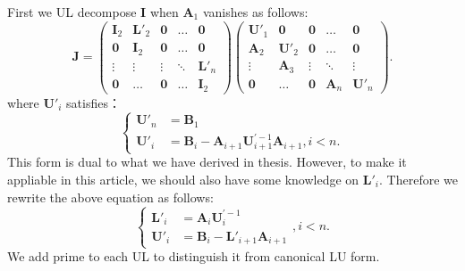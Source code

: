 \documentclass[12pt]{article}
\begin{document}
First we UL decompose $\bm{I}$ when $\bm{A}_1$ vanishes as follows:
\begin{equation}\label{eq:UL}
  \bm{J}=\begin{pmatrix}
                 \bm{I}_2 & \bm{L'}_2 & \bm{0} & \dots & \bm{0} \\
                 \bm{0} & \bm{I}_2 & \bm{0} & \dots & \bm{0} \\
                 \vdots & \vdots & \vdots & \ddots & \bm{L'}_{n} \\
                 \bm{0} & \dots & \bm{0} & \dots & \bm{I}_{2}
               \end{pmatrix}
               \begin{pmatrix}
                 \bm{U'}_1 & \bm{0} & \bm{0} & \dots & \bm{0} \\
                 \bm{A}_2 & \bm{U'}_2 & \bm{0} & \dots & \bm{0} \\
                 \vdots & \bm{A}_3 & \vdots & \ddots & \vdots \\
                 \bm{0} & \dots & \bm{0} & \bm{A}_n & \bm{U'}_{n}
               \end{pmatrix}.
\end{equation}
where $\bm{U'}_i$ satisfies：
\begin{equation}
\begin{cases}
  \bm{U'}_n &= \bm{B}_1 \\
  \bm{U'}_i &= \bm{B}_i-\bm{A}_{i+1}\bm{U}_{i+1}^{\bm{'}-1}\bm{A}_{i+1},i< n.
\end{cases}
\end{equation}
This form is dual to what we have derived in thesis. However, to make it appliable in this article, we should also have some knowledge on $\bm{L'}_i$. Therefore we rewrite the above equation as follows:
\begin{equation}
\begin{cases}
  \bm{L'}_i &= \bm{A}_i\bm{U}_i^{\bm{'}-1} \\
  \bm{U'}_i &= \bm{B}_i-\bm{L'}_{i+1}\bm{A}_{i+1}
\end{cases},i< n.
\end{equation}
We add prime to each UL to distinguish it from canonical LU form.
\end{document}
